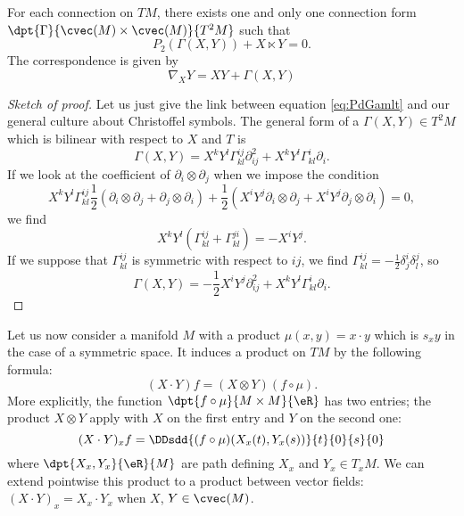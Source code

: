 \begin{lemma}
For each connection on $TM$, there exists one and only one connection form $\dpt{\Gamma}{\cvec(M)\times\cvec(M)}{T^2M}$ such that
\begin{equation} \label{eq:PdGamlt}
  P_2(\Gamma(X,Y))+X\ltimes Y=0.
\end{equation}
The correspondence is given by
\begin{equation}
  \nabla_XY=XY+\Gamma(X,Y)
\end{equation}


\begin{proof}[Sketch of proof]
Let us just give the link between equation \eqref{eq:PdGamlt} and our general culture about Christoffel symbols. The general form of a $\Gamma(X,Y)\in T^2M$ which is bilinear with respect to $X$ and $T$ is
\[
  \Gamma(X,Y)=X^kY^l\Gamma_{kl}^{ij}\partial^2_{ij}+X^kY^l\Gamma_{kl}^i\partial_i.
\]
If we look at the coefficient of $\partial_i\otimes\partial_j$ when we impose the condition
\[
  X^kY^l\Gamma_{kl}^{ij}\frac{1}{2}(\partial_i\otimes\partial_j+\partial_j\otimes\partial_i)+\frac{1}{2}(X^iY^j\partial_i\otimes\partial_j+X^iY^j\partial_j\otimes\partial_i)=0,
\]
we find
\[
  X^kY^l(\Gamma_{kl}^{ij}+\Gamma_{kl}^{ji})=-X^iY^j.
\]
If we suppose that $\Gamma_{kl}^{ij}$ is symmetric with respect to $ij$, we find $\Gamma_{kl}^{ij}=-\frac{1}{2}\delta_j^i\delta_l^j$, so
\begin{equation}
 \Gamma(X,Y)=-\frac{1}{2}X^iY^j\partial^2_{ij}+X^kY^l\Gamma_{kl}^i\partial_i.
\end{equation}


\end{proof}


\end{lemma}

Let us now consider a manifold $M$ with a product $\mu(x,y)=x\cdot y$ which is $s_xy$ in the case of a symmetric space. It induces a product on $TM$ by the following formula:
\begin{equation}  \label{eq:defcdotXY}
(X\cdot Y)f=(X\otimes Y)(f\circ \mu).
\end{equation}
More explicitly, the function $\dpt{f\circ\mu}{M\times M}{\eR}$ has two entries; the product $X\otimes Y$ apply with $X$ on the first entry and $Y$ on the second one:
\[
  (X\cdot Y)_xf=\DDsdd{ (f\circ\mu)(X_x(t),Y_x(s)) }{t}{0}{s}{0}
\]
where $\dpt{X_x,Y_x}{\eR}{M}$ are path defining $X_x$ and $Y_x\in T_xM$. We can extend pointwise this product to a product between vector fields: $(X\cdot Y)_x=X_x\cdot Y_x$ when $X$, $Y\in\cvec(M)$.

